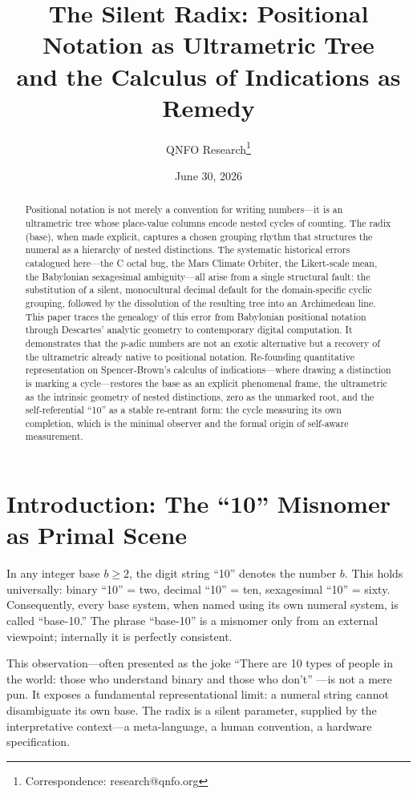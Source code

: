 \documentclass[12pt,a4paper]{article}
\title{\textbf{The Silent Radix: Positional Notation as Ultrametric Tree\\and the Calculus of Indications as Remedy}}
\author{QNFO Research\thanks{Correspondence: research@qnfo.org}}
\date{June 30, 2026}
\theoremstyle{definition}
\theoremstyle{remark}
\begin{document}
\maketitle

\begin{abstract}
Positional notation is not merely a convention for writing numbers---it is an ultrametric tree whose place-value columns encode nested cycles of counting. The radix (base), when made explicit, captures a chosen grouping rhythm that structures the numeral as a hierarchy of nested distinctions. The systematic historical errors catalogued here---the C octal bug, the Mars Climate Orbiter, the Likert-scale mean, the Babylonian sexagesimal ambiguity---all arise from a single structural fault: the substitution of a silent, monocultural decimal default for the domain-specific cyclic grouping, followed by the dissolution of the resulting tree into an Archimedean line. This paper traces the genealogy of this error from Babylonian positional notation through Descartes' analytic geometry to contemporary digital computation. It demonstrates that the $p$-adic numbers are not an exotic alternative but a recovery of the ultrametric already native to positional notation. Re-founding quantitative representation on Spencer-Brown's calculus of indications---where drawing a distinction is marking a cycle---restores the base as an explicit phenomenal frame, the ultrametric as the intrinsic geometry of nested distinctions, zero as the unmarked root, and the self-referential ``10'' as a stable re-entrant form: the cycle measuring its own completion, which is the minimal observer and the formal origin of self-aware measurement.
\end{abstract}

\section{Introduction: The ``10'' Misnomer as Primal Scene}

In any integer base $b \geq 2$, the digit string ``10'' denotes the number $b$. This holds universally: binary ``10'' = two, decimal ``10'' = ten, sexagesimal ``10'' = sixty. Consequently, every base system, when named using its own numeral system, is called ``base-10.'' The phrase ``base-10'' is a misnomer only from an external viewpoint; internally it is perfectly consistent.

This observation---often presented as the joke ``There are 10 types of people in the world: those who understand binary and those who don't'' \cite{hofstadter1979}---is not a mere pun. It exposes a fundamental representational limit: a numeral string cannot disambiguate its own base. The radix is a silent parameter, supplied by the interpretative context---a meta-language, a human convention, a hardware specification.
\end{document}
